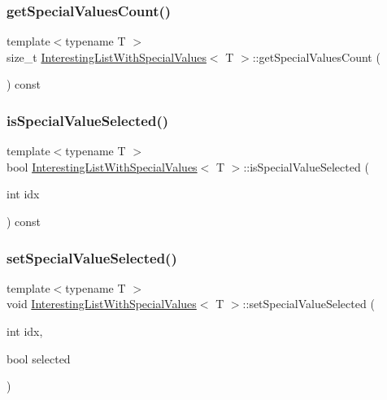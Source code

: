 \subsubsection{\texorpdfstring{getSpecialValuesCount()}{getSpecialValuesCount()}}
{\footnotesize\ttfamily template$<$typename T $>$ \\
size\+\_\+t \mbox{\hyperlink{class_interesting_list_with_special_values}{Interesting\+List\+With\+Special\+Values}}$<$ T $>$\+::get\+Special\+Values\+Count (\begin{DoxyParamCaption}{ }\end{DoxyParamCaption}) const\hspace{0.3cm}{\ttfamily [inline]}}

\mbox{\label{class_interesting_list_with_special_values_a00bd1929e768dfbbe10bde65ea2f3424}} 
\subsubsection{\texorpdfstring{isSpecialValueSelected()}{isSpecialValueSelected()}}
{\footnotesize\ttfamily template$<$typename T $>$ \\
bool \mbox{\hyperlink{class_interesting_list_with_special_values}{Interesting\+List\+With\+Special\+Values}}$<$ T $>$\+::is\+Special\+Value\+Selected (\begin{DoxyParamCaption}\item[{int}]{idx }\end{DoxyParamCaption}) const\hspace{0.3cm}{\ttfamily [inline]}}

\mbox{\label{class_interesting_list_with_special_values_ac285c42925498992d4ec15911c6f926b}} 
\subsubsection{\texorpdfstring{setSpecialValueSelected()}{setSpecialValueSelected()}}
{\footnotesize\ttfamily template$<$typename T $>$ \\
void \mbox{\hyperlink{class_interesting_list_with_special_values}{Interesting\+List\+With\+Special\+Values}}$<$ T $>$\+::set\+Special\+Value\+Selected (\begin{DoxyParamCaption}\item[{int}]{idx,  }\item[{bool}]{selected }\end{DoxyParamCaption})\hspace{0.3cm}{\ttfamily [inline]}}

